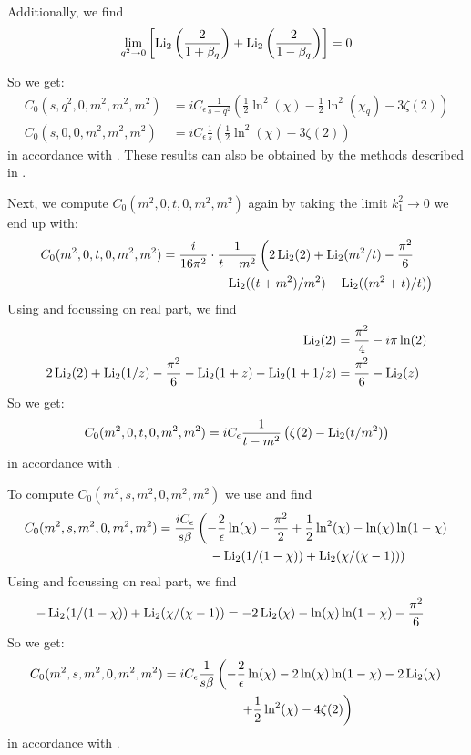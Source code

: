Additionally, we find
\begin{equation}
\lim_{q^2\rightarrow 0}\left[\operatorname{\text{Li}_2}\left(\frac 2 {1+\beta_q}\right)+\operatorname{\text{Li}_2}\left(\frac 2 {1-\beta_q}\right)\right] = 0
\end{equation}

So we get:
\begin{align}
C_0(s,q^2,0,m^2,m^2,m^2)&=iC_\epsilon\frac 1{s-q^2}\left(\frac 1 2\ln^2(\chi)-\frac 1 2\ln^2(\chi_q)-3\zeta(2)\right)\\
C_0(s,0,0,m^2,m^2,m^2)&=iC_\epsilon\frac 1{s}\left(\frac 1 2\ln^2(\chi)-3\zeta(2)\right)
\end{align}
in accordance with \cite{Bojak:2000eu}\cite{PhysRevD.40.54}\cite{Laenen1993162}. These results can also be obtained by the methods described in \cite[chap. 3]{Bojak:2000eu}.

Next, we compute $C_0(m^2,0,t,0,m^2,m^2)$ again by taking the limit $k_1^2\rightarrow 0$ we end up with:
\begin{align}
C_0(m^2,0,t,0,m^2,m^2) &= \frac{i}{16\pi^2}\cdot\frac 1{t-m^2}\left(2\operatorname{\text{Li}_2}(2) + \operatorname{\text{Li}_2}(m^2/t)-\frac{\pi^2}6\right.\nonumber\\
 &\hspace{40pt}\left.-\operatorname{\text{Li}_2}((t+m^2)/m^2)-\operatorname{\text{Li}_2}((m^2+t)/t)\right)
\end{align}
Using \cite{Zagier2007} and focussing on real part, we find
\begin{align}
\operatorname{\text{Li}_2}(2) &= \frac{\pi^2}4-i\pi\ln(2)\\
2\operatorname{\text{Li}_2}(2) + \operatorname{\text{Li}_2}(1/z)-\frac{\pi^2}6-\operatorname{\text{Li}_2}(1+z)-\operatorname{\text{Li}_2}(1+1/z) &=\frac{\pi^2}6-\operatorname{\text{Li}_2}(z)
\end{align}
So we get:
\begin{equation}
C_0(m^2,0,t,0,m^2,m^2)=iC_\epsilon\frac 1{t-m^2}\left(\zeta(2)-\operatorname{\text{Li}_2}(t/m^2)\right)
\end{equation}
in accordance with \cite{Bojak:2000eu}\cite{PhysRevD.40.54}.

To compute $C_0(m^2,s,m^2,0,m^2,m^2)$ we use \cite{Bojak:2000eu} and find
\begin{align}
C_0(m^2,s,m^2,0,m^2,m^2) &= \frac{i C_\epsilon}{s\beta}\left(-\frac 2 {\epsilon} \ln(\chi)-\frac{\pi^2}2 + \frac 1 2\ln^2(\chi) - \ln(\chi)\ln(1-\chi)\right.\nonumber\\
 &\hspace{40pt}\left.-\operatorname{\text{Li}_2}(1/(1-\chi))+\operatorname{\text{Li}_2}(\chi/(\chi-1))\right)
\end{align}
Using \cite{Zagier2007} and focussing on real part, we find
\begin{align}
-\operatorname{\text{Li}_2}(1/(1-\chi)) + \operatorname{\text{Li}_2}(\chi/(\chi-1))&=-2\operatorname{\text{Li}_2}(\chi)-\ln(\chi)\ln(1-\chi)-\frac{\pi^2}6
\end{align}
So we get:
\begin{align}
C_0(m^2,s,m^2,0,m^2,m^2) &=iC_\epsilon\frac 1{s\beta}\left(-\frac 2 {\epsilon} \ln(\chi)-2\ln(\chi)\ln(1-\chi)-2\operatorname{\text{Li}_2}(\chi)\right.\nonumber\\
 &\hspace{60pt}\left.+\frac 1 2\ln^2(\chi)-4\zeta(2)\right)
\end{align}
in accordance with \cite{Bojak:2000eu}\cite{PhysRevD.40.54}.

